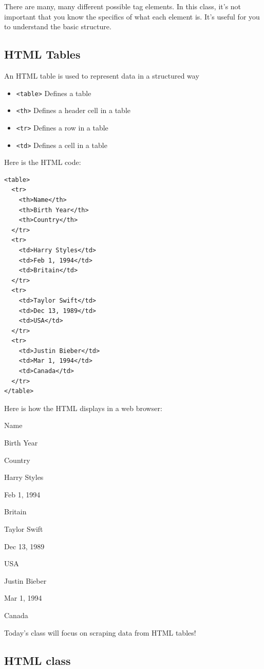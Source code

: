 \documentclass[
  letterpaper,
  DIV=11,
  numbers=noendperiod]{scrartcl}
\providecommand{\tightlist}{%
  \setlength{\itemsep}{0pt}\setlength{\parskip}{0pt}}\usepackage{longtable,booktabs,array}
\begin{document}
There are many, many different possible tag elements. In this class,
it's not important that you know the specifics of what each element is.
It's useful for you to understand the basic structure.

\hypertarget{html-tables}{%
\subsection{HTML Tables}\label{html-tables}}

An HTML table is used to represent data in a structured way

\begin{itemize}
\tightlist
\item
  \texttt{\textless{}table\textgreater{}} Defines a table
\item
  \texttt{\textless{}th\textgreater{}} Defines a header cell in a table
\item
  \texttt{\textless{}tr\textgreater{}} Defines a row in a table
\item
  \texttt{\textless{}td\textgreater{}} Defines a cell in a table
\end{itemize}

Here is the HTML code:

\begin{verbatim}
<table>
  <tr>
    <th>Name</th>
    <th>Birth Year</th>  
    <th>Country</th>
  </tr>
  <tr>
    <td>Harry Styles</td>
    <td>Feb 1, 1994</td>
    <td>Britain</td>
  </tr>
  <tr>
    <td>Taylor Swift</td>
    <td>Dec 13, 1989</td>
    <td>USA</td>
  </tr>
  <tr>
    <td>Justin Bieber</td>
    <td>Mar 1, 1994</td>
    <td>Canada</td>
  </tr>
</table>
\end{verbatim}

Here is how the HTML displays in a web browser:

Name

Birth Year

Country

Harry Styles

Feb 1, 1994

Britain

Taylor Swift

Dec 13, 1989

USA

Justin Bieber

Mar 1, 1994

Canada

Today's class will focus on scraping data from HTML tables!

\hypertarget{html-class}{%
\subsection{HTML class}\label{html-class}}
\end{document}
